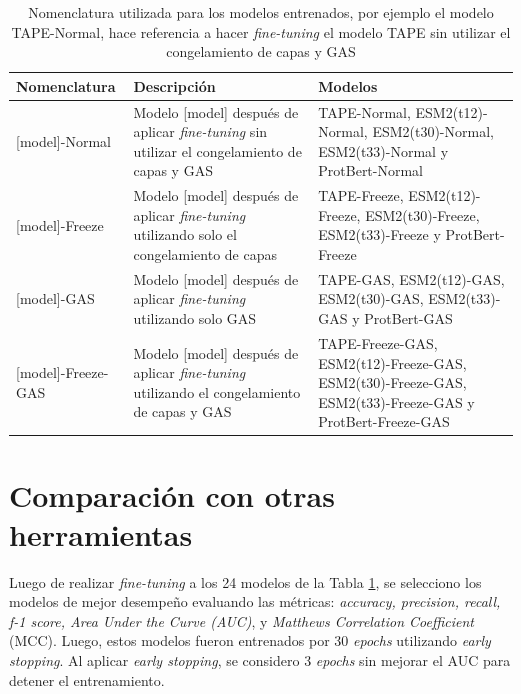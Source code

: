 \begin{table}[H]
	\centering
	\caption[Nomenclatura utilizada para los modelos entrenados.]{Nomenclatura utilizada para los modelos entrenados, por ejemplo el modelo TAPE-Normal, hace referencia a hacer \textit{fine-tuning} el modelo TAPE sin utilizar el congelamiento de capas y GAS}
	\label{tab:cmodel_names}
	
	\small
	\setlength{\tabcolsep}{0.5em} %
	{\renewcommand{\arraystretch}{1.5}%
	\begin{tabular}{lp{5cm}p{5cm}}
		\textbf{Nomenclatura}                 & \textbf{Descripción}       &
		\textbf{Modelos}                                                                             \\ \hline
		{[}model{]}-Normal     & Modelo {[}model{]} después de aplicar \textit{fine-tuning} sin utilizar el congelamiento de capas y GAS & TAPE-Normal, ESM2(t12)-Normal, ESM2(t30)-Normal, ESM2(t33)-Normal y ProtBert-Normal \\
		
		{[}model{]}-Freeze     & Modelo {[}model{]} después de aplicar \textit{fine-tuning} utilizando solo el congelamiento de capas   & TAPE-Freeze, ESM2(t12)-Freeze, ESM2(t30)-Freeze, ESM2(t33)-Freeze y ProtBert-Freeze \\
		
		{[}model{]}-GAS        & Modelo {[}model{]} después de aplicar \textit{fine-tuning} utilizando solo GAS                      & TAPE-GAS, ESM2(t12)-GAS, ESM2(t30)-GAS, ESM2(t33)-GAS y ProtBert-GAS    \\
		
		{[}model{]}-Freeze-GAS & Modelo {[}model{]} después de aplicar \textit{fine-tuning} utilizando el congelamiento de capas y GAS  & TAPE-Freeze-GAS, ESM2(t12)-Freeze-GAS, ESM2(t30)-Freeze-GAS, ESM2(t33)-Freeze-GAS y ProtBert-Freeze-GAS
	\end{tabular}
}
\end{table}


\section{Comparación con otras herramientas}

Luego de realizar \textit{fine-tuning} a los 24 modelos de la Tabla \ref{tab:cmodel_names}, se selecciono los modelos de mejor desempeño evaluando las métricas:  \textit{accuracy, precision, recall, f-1 score, Area Under the Curve (AUC)}, y \textit{Matthews Correlation Coefficient} (MCC). Luego, estos modelos fueron entrenados por 30 \textit{epochs} utilizando \textit{early stopping}. Al aplicar \textit{early stopping}, se considero 3 \textit{epochs} sin mejorar el AUC para detener el entrenamiento. 

